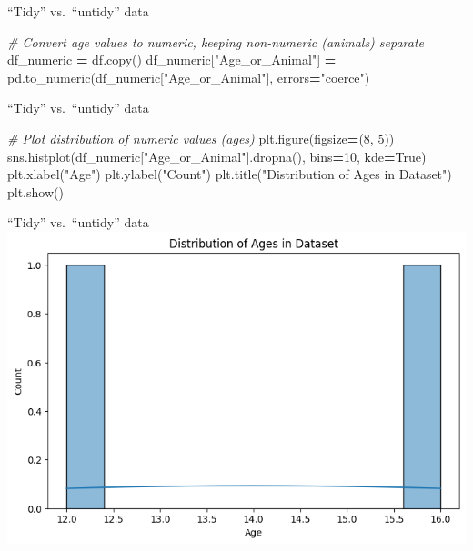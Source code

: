 \documentclass[
  ignorenonframetext,
]{beamer}
\newenvironment{Shaded}{\begin{snugshade}}{\end{snugshade}}
\newcommand{\CommentTok}[1]{\textcolor[rgb]{0.56,0.35,0.01}{\textit{#1}}}
\newcommand{\DecValTok}[1]{\textcolor[rgb]{0.00,0.00,0.81}{#1}}
\newcommand{\NormalTok}[1]{#1}
\newcommand{\OperatorTok}[1]{\textcolor[rgb]{0.81,0.36,0.00}{\textbf{#1}}}
\newcommand{\StringTok}[1]{\textcolor[rgb]{0.31,0.60,0.02}{#1}}
\newcommand{\VariableTok}[1]{\textcolor[rgb]{0.00,0.00,0.00}{#1}}
\begin{document}
\begin{frame}[fragile]{``Tidy'' vs.~``untidy'' data}
\label{tidy-vs.-untidy-data-4}

\begin{Shaded}
\begin{Highlighting}[]
\CommentTok{\# Convert age values to numeric, keeping non{-}numeric (animals) separate}
\NormalTok{df\_numeric }\OperatorTok{=}\NormalTok{ df.copy()}
\NormalTok{df\_numeric[}\StringTok{"Age\_or\_Animal"}\NormalTok{] }\OperatorTok{=}\NormalTok{ pd.to\_numeric(df\_numeric[}\StringTok{"Age\_or\_Animal"}\NormalTok{], errors}\OperatorTok{=}\StringTok{"coerce"}\NormalTok{)}
\end{Highlighting}
\end{Shaded}
\end{frame}

\begin{frame}[fragile]{``Tidy'' vs.~``untidy'' data}
\label{tidy-vs.-untidy-data-5}

\begin{Shaded}
\begin{Highlighting}[]
\CommentTok{\# Plot distribution of numeric values (ages)}
\NormalTok{plt.figure(figsize}\OperatorTok{=}\NormalTok{(}\DecValTok{8}\NormalTok{, }\DecValTok{5}\NormalTok{))}
\NormalTok{sns.histplot(df\_numeric[}\StringTok{"Age\_or\_Animal"}\NormalTok{].dropna(), bins}\OperatorTok{=}\DecValTok{10}\NormalTok{, kde}\OperatorTok{=}\VariableTok{True}\NormalTok{)}
\NormalTok{plt.xlabel(}\StringTok{"Age"}\NormalTok{)}
\NormalTok{plt.ylabel(}\StringTok{"Count"}\NormalTok{)}
\NormalTok{plt.title(}\StringTok{"Distribution of Ages in Dataset"}\NormalTok{)}
\NormalTok{plt.show()}
\end{Highlighting}
\end{Shaded}
\end{frame}

\begin{frame}{``Tidy'' vs.~``untidy'' data}
\label{tidy-vs.-untidy-data-6}
\includegraphics{../images/im257.png}
\end{frame}
\end{document}
